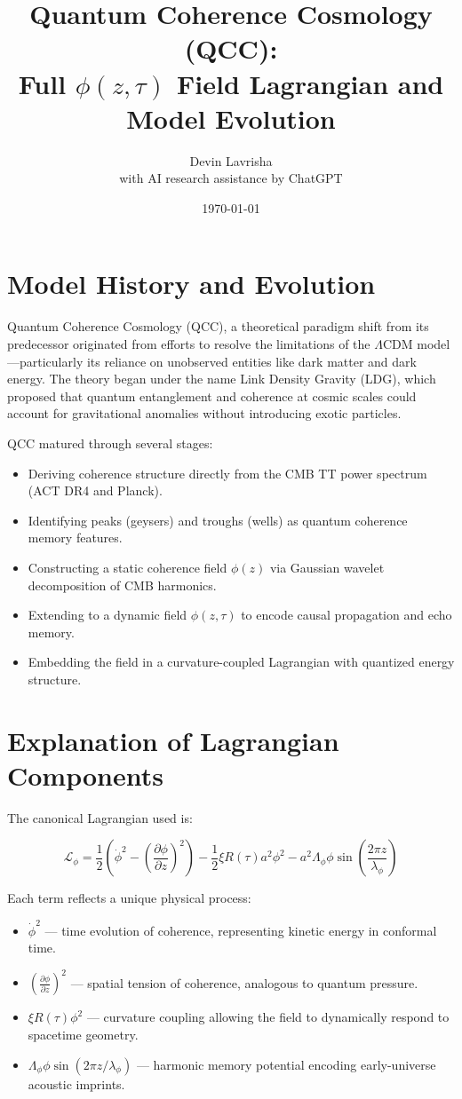 \documentclass[11pt]{article}
\title{Quantum Coherence Cosmology (QCC):\\
Full $\phi(z, \tau)$ Field Lagrangian and Model Evolution}
\author{Devin Lavrisha \\ \small{with AI research assistance by ChatGPT}}
\date{\today}
\begin{document}
\maketitle

\section{Model History and Evolution}


Quantum Coherence Cosmology (QCC), a theoretical paradigm shift from its predecessor  originated from efforts to resolve the limitations of the $\Lambda$CDM model—particularly its reliance on unobserved entities like dark matter and dark energy. The theory began under the name Link Density Gravity (LDG), which proposed that quantum entanglement and coherence at cosmic scales could account for gravitational anomalies without introducing exotic particles.

QCC matured through several stages:
\begin{itemize}
\item Deriving coherence structure directly from the CMB TT power spectrum (ACT DR4 and Planck).
\item Identifying peaks (geysers) and troughs (wells) as quantum coherence memory features.
\item Constructing a static coherence field $\phi(z)$ via Gaussian wavelet decomposition of CMB harmonics.
\item Extending to a dynamic field $\phi(z, \tau)$ to encode causal propagation and echo memory.
\item Embedding the field in a curvature-coupled Lagrangian with quantized energy structure.
\end{itemize}

\section{Explanation of Lagrangian Components}

The canonical Lagrangian used is:

\begin{equation}
\mathcal{L}_\phi = \frac{1}{2} \left( \dot{\phi}^2 - \left( \frac{\partial \phi}{\partial z} \right)^2 \right) 
- \frac{1}{2} \xi R(\tau) a^2 \phi^2 
- a^2 \Lambda_\phi \phi \sin\left( \frac{2\pi z}{\lambda_\phi} \right)
\end{equation}

Each term reflects a unique physical process:
\begin{itemize}
\item $\dot{\phi}^2$ — time evolution of coherence, representing kinetic energy in conformal time.
\item $\left(\frac{\partial \phi}{\partial z}\right)^2$ — spatial tension of coherence, analogous to quantum pressure.
\item $\xi R(\tau) \phi^2$ — curvature coupling allowing the field to dynamically respond to spacetime geometry.
\item $\Lambda_\phi \phi \sin(2\pi z / \lambda_\phi)$ — harmonic memory potential encoding early-universe acoustic imprints.
\end{itemize}
\end{document}
